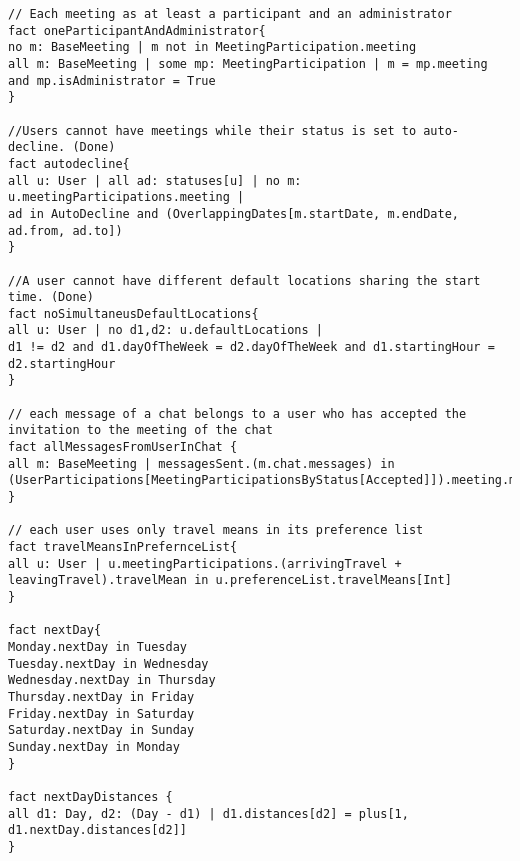 \begin{lstlisting}[style=alloy]
// Each meeting as at least a participant and an administrator
fact oneParticipantAndAdministrator{
no m: BaseMeeting | m not in MeetingParticipation.meeting
all m: BaseMeeting | some mp: MeetingParticipation | m = mp.meeting and mp.isAdministrator = True
}

//Users cannot have meetings while their status is set to auto-decline. (Done)
fact autodecline{
all u: User | all ad: statuses[u] | no m: u.meetingParticipations.meeting | 
ad in AutoDecline and (OverlappingDates[m.startDate, m.endDate, ad.from, ad.to])
}

//A user cannot have different default locations sharing the start time. (Done)
fact noSimultaneusDefaultLocations{
all u: User | no d1,d2: u.defaultLocations | 
d1 != d2 and d1.dayOfTheWeek = d2.dayOfTheWeek and d1.startingHour = d2.startingHour
}

// each message of a chat belongs to a user who has accepted the invitation to the meeting of the chat
fact allMessagesFromUserInChat {
all m: BaseMeeting | messagesSent.(m.chat.messages) in  (UserParticipations[MeetingParticipationsByStatus[Accepted]]).meeting.m
}

// each user uses only travel means in its preference list
fact travelMeansInPrefernceList{
all u: User | u.meetingParticipations.(arrivingTravel + leavingTravel).travelMean in u.preferenceList.travelMeans[Int]
}

fact nextDay{
Monday.nextDay in Tuesday
Tuesday.nextDay in Wednesday
Wednesday.nextDay in Thursday
Thursday.nextDay in Friday
Friday.nextDay in Saturday
Saturday.nextDay in Sunday
Sunday.nextDay in Monday
}

fact nextDayDistances {
all d1: Day, d2: (Day - d1) | d1.distances[d2] = plus[1, d1.nextDay.distances[d2]]
}
\end{lstlisting}